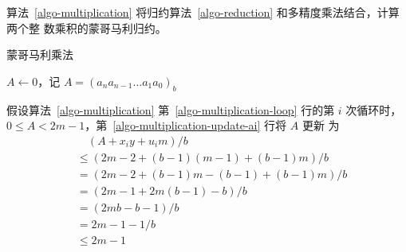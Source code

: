 算法~\ref{algo-multiplication} 将归约算法~\ref{algo-reduction} 和多精度乘法结合，计算两个整
数乘积的蒙哥马利归约。

\begin{algorithm}
  \caption{蒙哥马利乘法}\label{algo-multiplication}
  \DontPrintSemicolon
  \BlankLine
  \(A\leftarrow 0\)，记 \(A=(a_na_{n-1}\dots a_1a_0)_b\)\;
  \;
\end{algorithm}

\begin{note}
  假设算法~\ref{algo-multiplication} 第~\ref{algo-multiplication-loop} 行的第 \(i\)
  次循环时，\(0\le A < 2m-1\)，第~\ref{algo-multiplication-update-ai} 行将 \(A\) 更新
  为 
    \begin{align*}
      &\quad (A+x_i y+u_i m)/b \\
      &\le (2m-2 + (b-1)(m-1) + (b-1)m)/b \\
      &=(2m-2 + (b-1)m - (b-1) + (b-1)m)/b \\
      &=(2m-1 + 2m(b-1) - b)/b \\
      &=(2mb-b-1)/b \\
      &=2m-1-1/b \\
      &\le 2m-1
    \end{align*}
\end{note}

